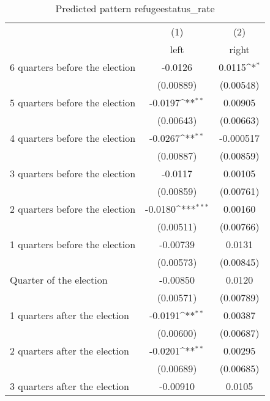 \begin{table}[htbp]\centering
\def\sym#1{\ifmmode^{#1}\else\(^{#1}\)\fi}
\caption{Predicted pattern refugeestatus\_rate}
\begin{tabular}{l*{2}{c}}
\hline\hline
                    &\multicolumn{1}{c}{(1)}&\multicolumn{1}{c}{(2)}\\
                    &\multicolumn{1}{c}{left}&\multicolumn{1}{c}{right}\\
\hline
 6 quarters before the election&     -0.0126         &      0.0115\sym{*}  \\
                    &   (0.00889)         &   (0.00548)         \\
[1em]
 5 quarters before the election&     -0.0197\sym{**} &     0.00905         \\
                    &   (0.00643)         &   (0.00663)         \\
[1em]
 4 quarters before the election&     -0.0267\sym{**} &   -0.000517         \\
                    &   (0.00887)         &   (0.00859)         \\
[1em]
 3 quarters before the election&     -0.0117         &     0.00105         \\
                    &   (0.00859)         &   (0.00761)         \\
[1em]
 2 quarters before the election&     -0.0180\sym{***}&     0.00160         \\
                    &   (0.00511)         &   (0.00766)         \\
[1em]
 1 quarters before the election&    -0.00739         &      0.0131         \\
                    &   (0.00573)         &   (0.00845)         \\
[1em]
Quarter of the election&    -0.00850         &      0.0120         \\
                    &   (0.00571)         &   (0.00789)         \\
[1em]
 1 quarters after the election&     -0.0191\sym{**} &     0.00387         \\
                    &   (0.00600)         &   (0.00687)         \\
[1em]
 2 quarters after the election&     -0.0201\sym{**} &     0.00295         \\
                    &   (0.00689)         &   (0.00685)         \\
[1em]
 3 quarters after the election&    -0.00910         &      0.0105         \\

\end{tabular}
\end{table}
